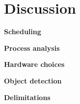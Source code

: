 \chapter{Discussion} 
\label{chap:Discussion}

\textbf{Scheduling}

\textbf{Process analysis}

\textbf{Hardware choices}


\textbf{Object detection}

\textbf{Delimitations}



